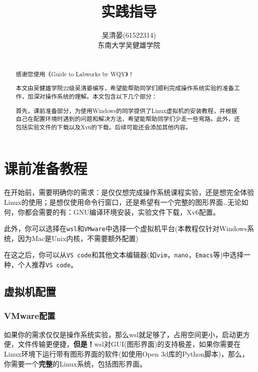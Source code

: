 \documentclass[
]{article}
\title{实践指导}
\author{吴清晏(61522314) \\ 东南大学吴健雄学院}
\date{}
\begin{document}
\maketitle

\newpage
\renewcommand{\abstractname}{\LARGE\textbf{前言}}
\begin{abstract}\large
  ~\\
  感谢您使用《Guide to Labworks by WQY》！

  本文由吴健雄学院22级吴清晏编写，希望能帮助同学们顺利完成操作系统实验的准备工作，加深对操作系统的理解。本文包含以下几个部分：

  首先，课前准备部分，为使用Windows的同学提供了Linux虚拟机的安装教程，并根据自己在配置环境时遇到的问题和解决方法，希望能帮助同学们少走一些弯路。此外，还包括实验文件的下载以及Xv6的下载。后续可能还会添加其他内容。

\end{abstract}

\newpage
\begin{center}
  \tableofcontents
\end{center}
\newpage

\section{课前准备教程}\label{ux8bfeux524dux51c6ux5907ux6559ux7a0b}

在开始前，需要明确你的需求：是仅仅想完成操作系统课程实验，还是想完全体验Linux的使用；是想仅使用命令行窗口，还是希望有一个完整的图形界面\ldots 无论如何，你都会需要的有：GNU编译环境安装，实验文件下载，Xv6配置。

此外，你可以选择在\texttt{wsl}和\texttt{VMware}中选择一个虚拟机平台(本教程仅针对Windows系统，因为Mac是Unix内核，不需要额外配置)

在这之后，你可以从\texttt{VS\ code}和其他文本编辑器(如\texttt{vim}，\texttt{nano}，\texttt{Emacs}等)中选择一种，个人推荐\texttt{VS\ code}。

\subsection{虚拟机配置}\label{ux865aux62dfux673aux914dux7f6e}

\subsubsection{VMware配置}\label{vmwareux914dux7f6e}

如果你的需求仅仅是操作系统实验，那么wsl就足够了，占用空间更小，启动更方便，文件传输更便捷，\textbf{但是！}wsl对GUI(图形界面)的支持极差，如果你需要在Linux环境下运行带有图形界面的软件(如使用Open
3d库的Python脚本)，那么，你需要一个\textbf{完整}的Linux系统，包括图形界面。
\end{document}
